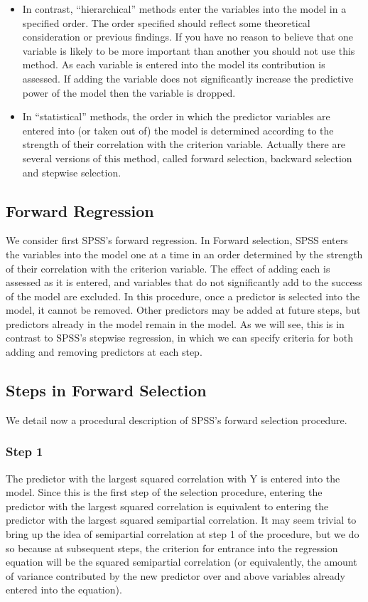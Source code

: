 \documentclass[a4paper,12pt]{article}
\begin{document}
\begin{itemize}
	\item In contrast, “hierarchical” methods enter the variables into the model in a specified order. The order specified should reflect some theoretical consideration or previous
	findings. If you have no reason to believe that one variable is likely to be more important than another you should not use this method. As each variable is entered into the model its contribution is assessed. If adding the variable does not significantly increase the predictive power of the model then the variable is
	dropped.
	
\item In “statistical” methods, the order in which the predictor variables are entered into (or taken out of) the model is determined according to the strength of their correlation with the criterion variable. Actually there are several versions of this method, called forward selection, backward selection and stepwise selection.
\end{itemize}


\subsection{Forward Regression}
We consider first SPSS’s forward regression. In Forward selection, SPSS enters the variables into the model one at a time in an
order determined by the strength of their correlation with the criterion variable. The effect of adding each is assessed as it is entered, and variables that do not significantly add to the success of the model are excluded. In this procedure, once a predictor is selected into the model, it cannot be removed. Other predictors may be added at future steps, but predictors already in the model remain in the model. As we will see, this is in contrast to SPSS’s stepwise regression, in which we can specify criteria for both adding and removing predictors at each step.

\subsection{Steps in Forward Selection}
We detail now a procedural description of SPSS’s forward selection procedure.

\subsubsection*{Step 1}
The predictor with the largest squared correlation with Y is entered into the model. Since this is the first step of the selection procedure, entering the predictor with the largest squared correlation is equivalent to entering the predictor with the largest squared semipartial correlation. It may seem trivial to bring up the idea of semipartial correlation at step 1 of the procedure, but we do so because at subsequent steps, the criterion for entrance into the regression equation will be the squared semipartial correlation (or equivalently, the amount of variance contributed by the new predictor over and above variables already entered into the equation).
\end{document}
